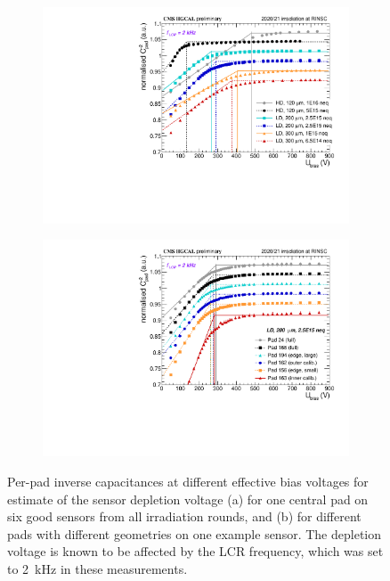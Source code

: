 \begin{figure}
	\captionsetup[subfigure]{aboveskip=-1pt,belowskip=-1pt}
	\centering
	\begin{subfigure}[b]{0.49\textwidth}
		\includegraphics[width=0.999\textwidth]{plots/channel_cv/channel_invCV_sensors_sensors.pdf}
		\subcaption{
		}
		\label{plot:pad_invCV_sensor}
	\end{subfigure}
	\hfill
	\begin{subfigure}[b]{0.49\textwidth}
		\includegraphics[width=0.999\textwidth]{plots/channel_cv/channel_invCV_sensors_channels.pdf}
		\subcaption{
		}
		\label{plot:pad_invCV_channels}
	\end{subfigure}
	\caption{
		Per-pad inverse capacitances at different effective bias voltages for estimate of the sensor depletion voltage (a) for one central pad on six good sensors from all irradiation rounds, and (b) for different pads with different geometries on one example sensor.
		The depletion voltage is known to be affected by the LCR frequency, which was set to \SI{2}{\kilo\hertz} in these measurements.
	}
\end{figure}